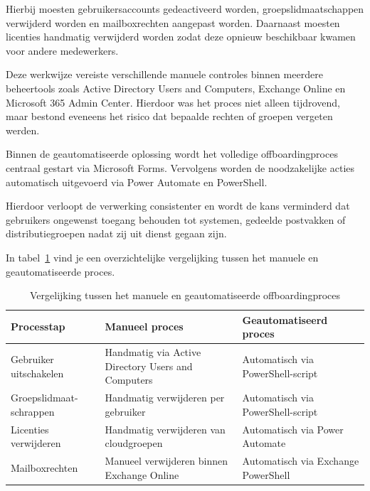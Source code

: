 Hierbij moesten gebruikersaccounts gedeactiveerd worden, groepslidmaatschappen verwijderd worden en mailboxrechten aangepast worden. Daarnaast moesten licenties handmatig verwijderd worden zodat deze opnieuw beschikbaar kwamen voor andere medewerkers.

Deze werkwijze vereiste verschillende manuele controles binnen meerdere beheertools zoals Active Directory Users and Computers, Exchange Online en Microsoft 365 Admin Center. Hierdoor was het proces niet alleen tijdrovend, maar bestond eveneens het risico dat bepaalde rechten of groepen vergeten werden.

Binnen de geautomatiseerde oplossing wordt het volledige offboardingproces centraal gestart via Microsoft Forms. Vervolgens worden de noodzakelijke acties automatisch uitgevoerd via Power Automate en PowerShell.

Hierdoor verloopt de verwerking consistenter en wordt de kans verminderd dat gebruikers ongewenst toegang behouden tot systemen, gedeelde postvakken of distributiegroepen nadat zij uit dienst gegaan zijn.

In tabel~\ref{tab:VergelijkingOffboarding} vind je een overzichtelijke vergelijking tussen het manuele en geautomatiseerde proces.

\begin{table}[htbp]
    \centering    
    \begin{tabular}{|p{4cm}|p{5cm}|p{5cm}|}
        \hline
        \textbf{Processtap} & \textbf{Manueel proces} & \textbf{Geautomatiseerd proces} \\
        \hline
        
        Gebruiker uitschakelen &
        Handmatig via Active Directory Users and Computers &
        Automatisch via PowerShell-script \\
        \hline
        
        Groepslidmaat-schrappen &
        Handmatig verwijderen per gebruiker &
        Automatisch via PowerShell-script \\
        \hline
        
        Licenties verwijderen &
        Handmatig verwijderen van cloudgroepen &
        Automatisch via Power Automate \\
        \hline
        
        Mailboxrechten &
        Manueel verwijderen binnen Exchange Online &
        Automatisch via Exchange PowerShell \\
        \hline
    \end{tabular}
    \caption{Vergelijking tussen het manuele en geautomatiseerde offboardingproces}
    \label{tab:VergelijkingOffboarding}
\end{table}

